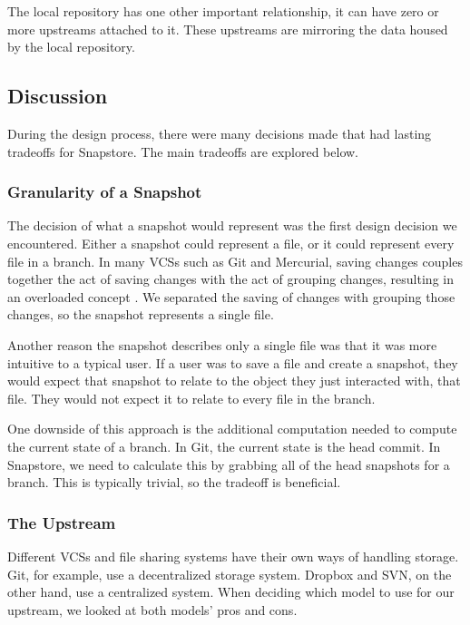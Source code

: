The local repository has one other important relationship, it can have zero or more upstreams attached to it. These upstreams are mirroring the data housed by the local repository.

\subsection{Discussion}

During the design process, there were many decisions made that had lasting tradeoffs for Snapstore. The main tradeoffs are explored below.

\subsubsection{Granularity of a Snapshot}

The decision of what a snapshot would represent was the first design decision we encountered. Either a snapshot could represent a file, or it could represent every file in a branch. In many VCSs such as Git and Mercurial, saving changes couples together the act of saving changes with the act of grouping changes, resulting in an overloaded concept \cite{Jackson}. We separated the saving of changes with grouping those changes, so the snapshot represents a single file.

Another reason the snapshot describes only a single file was that it was more intuitive to a typical user. If a user was to save a file and create a snapshot, they would expect that snapshot to relate to the object they just interacted with, that file. They would not expect it to relate to every file in the branch.

One downside of this approach is the additional computation needed to compute the current state of a branch. In Git, the current state is the head commit. In Snapstore, we need to calculate this by grabbing all of the head snapshots for a branch. This is typically trivial, so the tradeoff is beneficial.

\subsubsection{The Upstream}

Different VCSs and file sharing systems have their own ways of handling storage. Git, for example, use a decentralized storage system. Dropbox and SVN, on the other hand, use a centralized system. When deciding which model to use for our upstream, we looked at both models' pros and cons.

